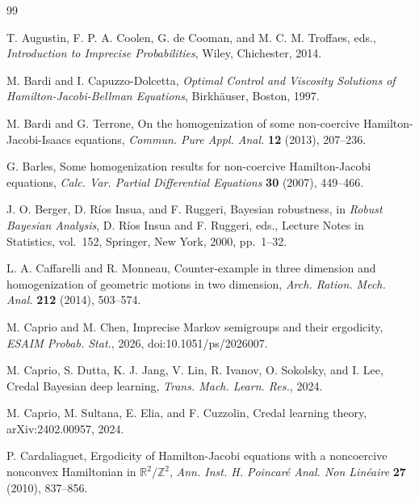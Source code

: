 \documentclass[11pt,reqno,noamsfonts]{amsart}
\theoremstyle{definition}
\theoremstyle{remark}
\begin{document}





\begin{thebibliography}{99}

T. Augustin, F. P. A. Coolen, G. de Cooman, and M. C. M. Troffaes, eds.,
\emph{Introduction to Imprecise Probabilities}, Wiley, Chichester, 2014.

M. Bardi and I. Capuzzo-Dolcetta,
\emph{Optimal Control and Viscosity Solutions of Hamilton-Jacobi-Bellman Equations},
Birkh\"auser, Boston, 1997.

M. Bardi and G. Terrone,
On the homogenization of some non-coercive Hamilton-Jacobi-Isaacs equations,
\emph{Commun. Pure Appl. Anal.} \textbf{12} (2013), 207--236.

G. Barles,
Some homogenization results for non-coercive Hamilton-Jacobi equations,
\emph{Calc. Var. Partial Differential Equations} \textbf{30} (2007), 449--466.

J. O. Berger, D. R\'ios Insua, and F. Ruggeri,
Bayesian robustness,
in \emph{Robust Bayesian Analysis},
D. R\'ios Insua and F. Ruggeri, eds.,
Lecture Notes in Statistics, vol.~152,
Springer, New York, 2000, pp.~1--32.


L. A. Caffarelli and R. Monneau,
Counter-example in three dimension and homogenization of geometric motions in two dimension,
\emph{Arch. Ration. Mech. Anal.} \textbf{212} (2014), 503--574.

M. Caprio and M. Chen,
Imprecise Markov semigroups and their ergodicity,
\emph{ESAIM Probab. Stat.}, 2026, doi:10.1051/ps/2026007.

M. Caprio, S. Dutta, K. J. Jang, V. Lin, R. Ivanov, O. Sokolsky, and I. Lee,
Credal Bayesian deep learning,
\emph{Trans. Mach. Learn. Res.}, 2024.

M. Caprio, M. Sultana, E. Elia, and F. Cuzzolin,
Credal learning theory,
arXiv:2402.00957, 2024.

P. Cardaliaguet,
Ergodicity of Hamilton-Jacobi equations with a noncoercive nonconvex
Hamiltonian in $\mathbb R^2/\mathbb Z^2$,
\emph{Ann. Inst. H. Poincar\'e Anal. Non Lin\'eaire}
\textbf{27} (2010), 837--856.


\end{thebibliography}
\end{document}
